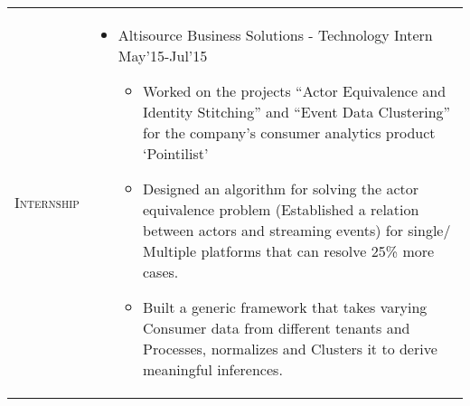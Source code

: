 \documentclass[a4paper]{article}
\begin{document}
\begin{longtable}{@{}m{3.0cm}m{14cm}@{}}
  \textrm{\textsc{Internship}} &
                                                  \vspace{-7mm}
                                                  \begin{itemize} 
                                                  \item 
                                                    Altisource Business Solutions - Technology Intern \hfill  May'15-Jul'15
                                                    \begin{itemize} \itemsep -2pt
                                                    \item Worked on the projects ``Actor Equivalence and Identity Stitching'' and ``Event Data Clustering''
                                                      for the company's consumer analytics product `Pointilist'
                                                    \item Designed an algorithm for solving the actor equivalence problem (Established a relation between
                                                      actors and streaming
                                                      events) for single/
                                                      Multiple platforms that
                                                      can resolve 25\% more cases.
                                                    \item Built a generic
                                                      framework that takes varying
                                                      Consumer data from
                                                      different tenants and
                                                      Processes, normalizes and
                                                      Clusters it to derive
                                                      meaningful inferences.
                                                    \end{itemize}
                                                  \end{itemize} \vspace*{-\baselineskip}


\end{longtable}
\end{document}
